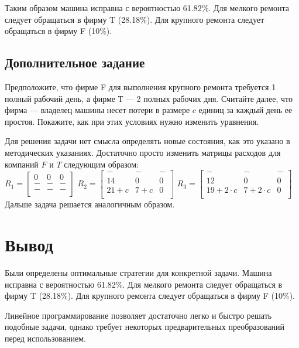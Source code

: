 

Таким образом машина исправна с вероятностью 61.82\%. Для мелкого ремонта следует обращаться в фирму T (28.18\%). Для крупного ремонта следует обращаться в фирму F (10\%).

\subsection{Дополнительное задание}

Предположите, что фирме F для выполнения крупного ремонта требуется 1 полный рабочий день, а фирме Т — 2 полных рабочих
дня. Считайте далее, что фирма — владелец машины несет потери в размере $c$ единиц за каждый день ее простоя. Покажите, как при этих условиях нужно изменить уравнения.

Для решения задачи нет смысла определять новые состояния, как это указано в методических указаниях. Достаточно просто изменить матрицы расходов для компаний $F$ и $T$ следующим образом:\\

$
R_1=\begin{bmatrix}
0 & 0 & 0 \\
- & - & - \\
- & - & - \\
\end{bmatrix}
$
$
R_2=\begin{bmatrix}
- & - & - \\
14 & 0 & 0 \\
21 + c & 7 + c & 0 \\
\end{bmatrix}
$
$
R_3=\begin{bmatrix}
- & - & - \\
12 & 0 & 0 \\
19 + 2\cdot c & 7 + 2\cdot c & 0 \\
\end{bmatrix}
$\\

Дальше задача решается аналогичным образом.

\section{Вывод}

Были определены оптимальные стратегии для конкретной задачи. Машина исправна с вероятностью 61.82\%. Для мелкого ремонта следует обращаться в фирму T (28.18\%). Для крупного ремонта следует обращаться в фирму F (10\%).

Линейное программирование позволяет достаточно легко и быстро решать подобные задачи, однако требует некоторых предварительных преобразований перед использованием.